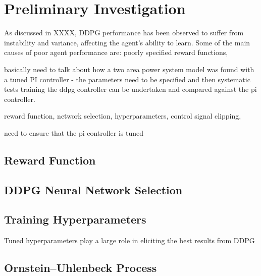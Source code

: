 \section{Preliminary Investigation}
As discussed in \textsection XXXX, DDPG performance has been observed to suffer from instability and variance,  affecting the agent's ability to learn. Some of the main causes of poor agent performance are: poorly specified reward functions, 

basically need to talk about how a two area power system model was found with a tuned PI controller - the parameters need to be specified and then systematic tests training the ddpg controller can be undertaken and compared against the pi controller.

reward function, network selection, hyperparameters, control signal clipping,

need to ensure that the pi controller is tuned




\subsection{Reward Function}


\subsection{DDPG Neural Network Selection}


\subsection{Training Hyperparameters}
Tuned hyperparameters play a large role in eliciting the best results from DDPG


\subsection{Ornstein–Uhlenbeck Process}

